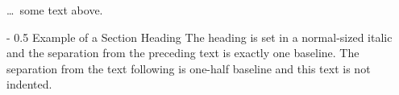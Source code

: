 \documentclass{article}
\makeatletter
\renewcommand\subsection{\@startsection
{subsection}{2}{0mm}%
{-\baselineskip}%
{0.5\baselineskip}%
{\normalfont\normalsize\itshape}}%
\makeatother
\begin{document}
  \ldots\ some text above.
  \subsection{Example of a Section Heading}
  The heading is set in a normal-sized italic
  and the separation from the preceding text
  is exactly one baseline. The separation
  from the text following is one-half
  baseline and this text is not indented.
\end{document}
